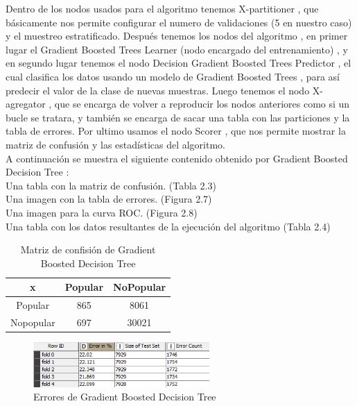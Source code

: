 	Dentro de los nodos usados para el algoritmo tenemos X-partitioner , que básicamente nos permite configurar el numero de validaciones
	(5 en nuestro caso) y el muestreo estratificado. Después tenemos los nodos del algoritmo , en primer lugar el Gradient Boosted Trees Learner (nodo encargado del entrenamiento)
	, y en segundo lugar tenemos el nodo Decision Gradient Boosted Trees Predictor , el cual clasifica los datos usando un modelo de Gradient Boosted Trees , para así predecir
	el valor de la clase de nuevas muestras. Luego tenemos el nodo X-agregator  , que se encarga de volver a reproducir los nodos anteriores como si un bucle se tratara,
	y también se encarga de sacar una tabla con las particiones y la tabla de errores. Por ultimo usamos el nodo Scorer , que nos permite mostrar la matriz de confusión y las estadísticas del algoritmo. \\

	A continuación se muestra el siguiente contenido obtenido por Gradient Boosted Decision Tree :	\\
	Una tabla con la matriz de confusión. (Tabla 2.3) \\
	Una imagen con la tabla de errores. (Figura 2.7) \\
	Una imagen para la curva ROC. (Figura 2.8)	\\
	Una tabla con los datos resultantes de la ejecución del algoritmo (Tabla 2.4)\\

	\begin{table}[htbp]
		\begin{center}
			\begin{tabular}{ | c | c | c | }
				\hline
				x & Popular & NoPopular \\ \hline
				Popular & 865 & 8061 \\ \hline 
				Nopopular & 697 & 30021 \\ \hline
			  \end{tabular}
			\caption{Matriz de confisión de Gradient Boosted Decision Tree}
			\label{tabla:sencilla}
		\end{center}
	\end{table}

	\begin{figure}[htb]
		\centering
		\includegraphics[width=0.6\textwidth]{./imagenes/11}
		\caption{Errores de Gradient Boosted Decision Tree} \label{fig:2}
	\end{figure}

